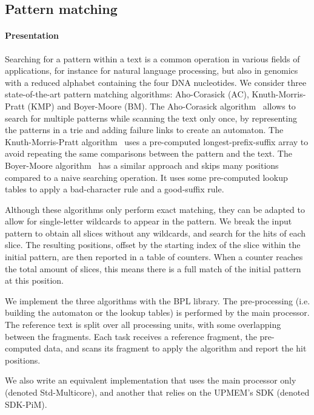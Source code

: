 \subsection{Pattern matching}
\label{sec:pmatch}

\paragraph{Presentation}

Searching for a pattern within a text is a common operation in various fields of applications, for instance for natural language processing, but also in genomics with a reduced alphabet containing the four DNA nucleotides.
We consider three state-of-the-art pattern matching algorithms: Aho-Corasick (AC), Knuth-Morris-Pratt (KMP) and Boyer-Moore (BM).
The Aho-Corasick algorithm~\cite{Aho1975} allows to search for multiple patterns while scanning the text only once, by representing the patterns in a trie and adding failure links to create an automaton.
The Knuth-Morris-Pratt algorithm~\cite{Knuth1977} uses a pre-computed longest-prefix-suffix array to avoid repeating the same comparisons between the pattern and the text.
The Boyer-Moore algorithm~\cite{Boyer1977} has a similar approach and skips many positions compared to a naive searching operation. It uses some pre-computed lookup tables to apply a bad-character rule and a good-suffix rule.

Although these algorithms only perform exact matching, they can be adapted to allow for single-letter wildcards to appear in the pattern.
We break the input pattern to obtain all slices without any wildcards, and search for the hits of each slice.
The resulting positions, offset by the starting index of the slice within the initial pattern, are then reported in a table of counters.
When a counter reaches the total amount of slices, this means there is a full match of the initial pattern at this position.

We implement the three algorithms with the BPL library.
The pre-processing (i.e. building the automaton or the lookup tables) is performed by the main processor.
The reference text is split over all processing units, with some overlapping between the fragments.
Each task receives a reference fragment, the pre-computed data, and scans its fragment to apply the algorithm and report the hit positions.

We also write an equivalent implementation that uses the main processor only (denoted Std-Multicore), and another that relies on the UPMEM's SDK (denoted SDK-PiM).
 
